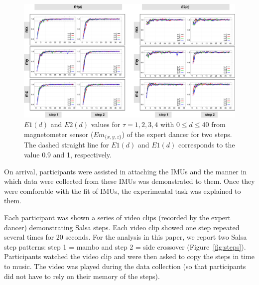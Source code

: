 \documentclass{sigchi}
\begin{document}
  \begin{figure}[!t]
  \centering    
  \includegraphics[width=1.0\textwidth]{e1e2_values_expert}
  \caption[PA]{$E1(d)$ and $E2(d)$ values for $\tau=1,2,3,4$ with $0 \leq d \leq 40$
  from magnetometer sensor ($Em_{ \{ x,y,z \} }$) of the expert dancer for two steps.
  The dashed straight line for $E1(d)$ and $E1(d)$ corresponds to the value 0.9 and 1, respectively.}
  \label{fig:e1e2}
  \end{figure}
  
%   
  
On arrival, participants were assisted in attaching the IMUs and the manner in which data were collected 
from these IMUs was demonstrated to them.  Once they were comforable with the fit of IMUs, 
the experimental task was explained to them.  

Each participant was shown a series of video clips (recorded by the expert dancer) demonstrating Salsa steps.  
Each video clip showed one step repeated several times for 20 seconds.  For the analysis in this paper, 
we report two Salsa step patterns: step 1 = mambo and step 2 = side crossover (Figure~\ref{fig:steps}).  
Participants watched the video clip and were then asked to copy the steps in time to music.  
The video was played during the data collection 
(so that participants did not have to rely on their memory of the steps).
\end{document}
